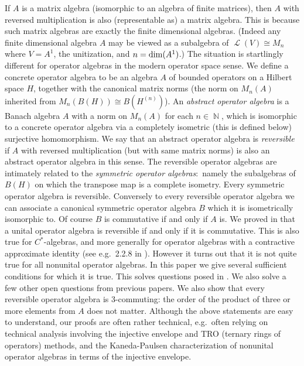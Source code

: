 \documentclass{amsart}
\theoremstyle{remark}
\theoremstyle{definition}
\numberwithin{equation}{section}
\DeclareMathOperator{\bN}{{\mathbb N}}
\DeclareMathOperator{\cL}{{\mathcal L}}
\begin{document}
If $A$ is a matrix algebra (isomorphic to an 
algebra of finite matrices), then $A$ with reversed multiplication is also 
(representable as) a matrix algebra.
This is because such matrix algebras are exactly the finite dimensional algebras.   (Indeed any 
finite dimensional algebra $A$ may be viewed as a subalgebra of $\cL(V) \cong M_n$ where $V = A^1$, the unitization, and $n = {\rm dim}(A^1)$.)   
The situation is startlingly different for operator algebras in the modern operator space sense.
We define a concrete  operator algebra to be an 
algebra $A$ of bounded operators on a Hilbert space $H$,
together with the canonical matrix norms (the norm on $M_n(A)$ 
inherited from $M_n(B(H)) \cong B(H^{(n)})$).  An {\em abstract operator algebra}  is 
a Banach algebra $A$ with a norm on $M_n(A)$ for each $n \in \bN$, which is   isomorphic to a concrete  operator algebra via 
a completely isometric (this is defined below) surjective homomorphism.    We say that an abstract operator algebra  is {\em reversible} if $A$ with reversed multiplication (but with same matrix norms) is also an abstract operator algebra in this sense.  The reversible operator algebras  are intimately related  to  the {\em symmetric operator algebras}:\ 
namely the subalgebras of $B(H)$ on which the transpose map is a  complete isometry. Every symmetric operator algebra is reversible.  Conversely to every reversible operator algebra we can associate a canonical symmetric operator algebra $B$ which it is isometrically isomorphic to.  Of course $B$ is commutative if and only if $A$ is.
We proved in 
\cite{BComm} that a unital operator algebra is reversible if and only if it is commutative.  This is also true for $C^*$-algebras,
and more generally for operator algebras with a contractive approximate identity (see e.g.\ 2.2.8 in 
 \cite{BLM}).  However it turns out that it is not quite true for all 
nonunital operator algebras.  In this paper we give several sufficient conditions for which it is true. 
This solves questions posed in \cite{BComm}.  We also solve a few other open questions from previous papers.    We also show that every reversible operator algebra is 3-commuting: the order of the product of three or more  elements from $A$ does not matter.  Although the above statements are easy to understand, our proofs are often rather technical, e.g.\ often relying on   technical analysis involving the injective envelope  and TRO (ternary rings of operators) methods, 
 and the Kaneda-Paulsen characterization 
of nonunital operator algebras in terms of the injective envelope.   
\end{document}
